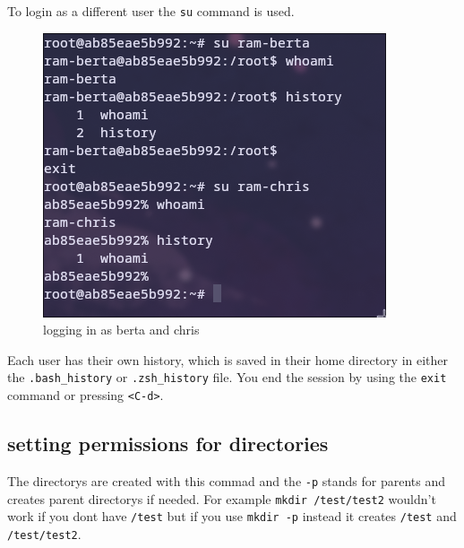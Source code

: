 \documentclass[a4paper]{article}
\begin{document}
To login as a different user the \texttt{su} command is used.

\begin{figure}[h]
	\centering
	\includegraphics[scale=0.3]{images/logggingin.png}
	\caption{logging in as berta and chris}
\end{figure}
Each user has their own history, which is saved in their home directory in either the \texttt{.bash\_history} or \texttt{.zsh\_history} file. You end the session by using the \texttt{exit} command or pressing \texttt{<C-d>}.

\subsection {setting permissions for directories}
The directorys are created with this commad and the \texttt{-p} stands for parents and creates parent directorys if needed. For example \texttt{mkdir /test/test2} wouldn't work if you dont have \texttt{/test} but if you use \texttt{mkdir -p} instead it creates \texttt{/test} and \texttt{/test/test2}.
\end{document}
